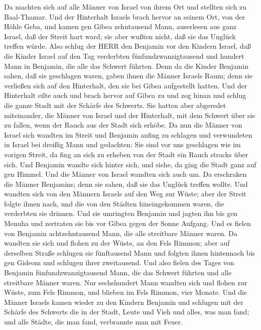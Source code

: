 Da machten sich auf alle Männer von Israel von ihrem Ort und stellten
sich zu Baal-Thamar. Und der Hinterhalt Israels brach hervor an seinem
Ort, von der Höhle Geba,  und kamen gen Gibea zehntausend
Mann, auserlesen aus ganz Israel, daß der Streit hart ward; sie aber
wußten nicht, daß sie das Unglück treffen würde.  Also
schlug der HERR den Benjamin vor den Kindern Israel, daß die Kinder
Israel auf den Tag verderbten fünfundzwanzigtausend und hundert Mann in
Benjamin, die alle das Schwert führten.  Denn da die Kinder
Benjamin sahen, daß sie geschlagen waren, gaben ihnen die Männer Israels
Raum; denn sie verließen sich auf den Hinterhalt, den sie bei Gibea
aufgestellt hatten.  Und der Hinterhalt eilte auch und
brach hervor auf Gibea zu und zog hinan und schlug die ganze Stadt mit
der Schärfe des Schwerts.  Sie hatten aber abgeredet
miteinander, die Männer von Israel und der Hinterhalt, mit dem Schwert
über sie zu fallen, wenn der Rauch aus der Stadt sich erhöbe.
 Da nun die Männer von Israel sich wandten im Streit und
Benjamin anfing zu schlagen und verwundeten in Israel bei dreißig Mann
und gedachten: Sie sind vor uns geschlagen wie im vorigen Streit,
 da fing an sich zu erheben von der Stadt ein Rauch stracks
über sich. Und Benjamin wandte sich hinter sich, und siehe, da ging die
Stadt ganz auf gen Himmel.  Und die Männer von Israel
wandten sich auch um. Da erschraken die Männer Benjamins; denn sie
sahen, daß sie das Unglück treffen wollte.  Und wandten
sich von den Männern Israels auf den Weg zur Wüste; aber der Streit
folgte ihnen nach, und die von den Städten hineingekommen waren, die
verderbten sie drinnen.  Und sie umringten Benjamin und
jagten ihn bis gen Menuha und zertraten sie bis vor Gibea gegen der
Sonne Aufgang.  Und es fielen von Benjamin achtzehntausend
Mann, die alle streitbare Männer waren.  Da wandten sie
sich und flohen zu der Wüste, an den Fels Rimmon; aber auf derselben
Straße schlugen sie fünftausend Mann und folgten ihnen hintennach bis
gen Gideom und schlugen ihrer zweitausend.  Und also fielen
des Tages von Benjamin fünfundzwanzigtausend Mann, die das Schwert
führten und alle streitbare Männer waren.  Nur sechshundert
Mann wandten sich und flohen zur Wüste, zum Fels Rimmon, und blieben im
Fels Rimmon, vier Monate.  Und die Männer Israels kamen
wieder zu den Kindern Benjamin und schlugen mit der Schärfe des Schwerts
die in der Stadt, Leute und Vieh und alles, was man fand; und alle
Städte, die man fand, verbrannte man mit Feuer.

